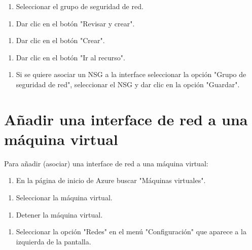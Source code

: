 \begin{enumerate}
\item Seleccionar el grupo de seguridad de red.
\end{enumerate}

\begin{enumerate}
\item Dar clic en el botón "Revisar y crear".
\end{enumerate}

\begin{enumerate}
\item Dar clic en el botón "Crear".
\end{enumerate}

\begin{enumerate}
\item Dar clic en el botón "Ir al recurso".
\end{enumerate}

\begin{enumerate}
\item Si se quiere asociar un NSG a la interface seleccionar la opción "Grupo de seguridad de red", seleccionar el NSG y dar clic en la opción "Guardar".
\end{enumerate}

\section{Añadir una interface de red a una máquina virtual}

Para añadir (asociar) una interface de red a una máquina virtual:

\begin{enumerate}
\item En la página de inicio de Azure buscar "Máquinas virtuales".
\end{enumerate}

\begin{enumerate}
\item Seleccionar la máquina virtual.
\end{enumerate}

\begin{enumerate}
\item Detener la máquina virtual.
\end{enumerate}

\begin{enumerate}
\item Seleccionar la opción "Redes" en el menú "Configuración" que aparece a la izquierda de la pantalla.
\end{enumerate}


